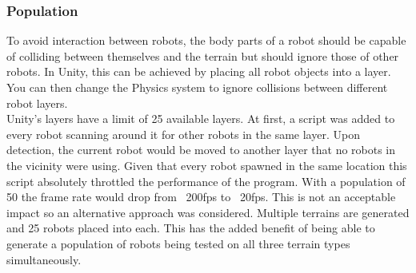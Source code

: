 \documentclass{article}
\begin{document}
\subsubsection{Population}
To avoid interaction between robots, the body parts of a robot should be capable of colliding between themselves and the terrain but should ignore those of other robots. In Unity, this can be achieved by placing all robot objects into a layer.  You can then change the Physics system to ignore collisions between different robot layers.\\ 
Unity’s layers have a limit of 25 available layers. At first, a script was added to every robot scanning around it for other robots in the same layer. Upon detection, the current robot would be moved to another layer that no robots in the vicinity were using. Given that every robot spawned in the same location this script absolutely throttled the performance of the program. With a population of 50 the frame rate would drop from ~200fps to ~20fps. This is not an acceptable impact so an alternative approach was considered. Multiple terrains are generated and 25 robots placed into each. This has the added benefit of being able to generate a population of robots being tested on all three terrain types simultaneously. 
\end{document}
